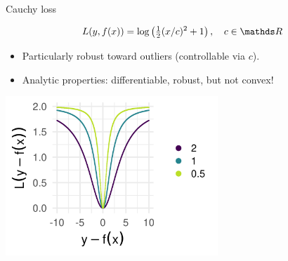 \begin{vbframe}{Cauchy loss}

$$
\Lxy = \log \left(\tfrac{1}{2} (x / c)^2 + 1\right), \quad c \in \R
$$

\normalsize
\begin{itemize}
\item Particularly robust toward outliers (controllable via $c$).
\item Analytic properties: differentiable, robust, but not convex! 
\end{itemize}


\begin{center}
\includegraphics[width = 0.6\textwidth]{figure_man/loss_cauchy_plot1.png}
\end{center}

\end{vbframe}



\endlecture


